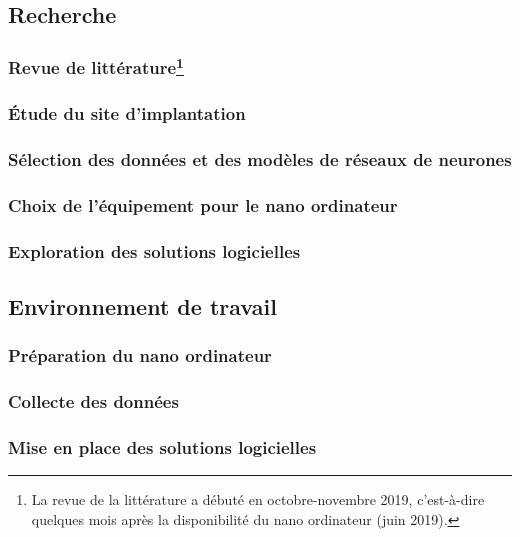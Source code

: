 \subsection{Recherche}

\subsubsection[Revue de littérature]{Revue de littérature\footnote{La revue de la littérature a débuté en octobre-novembre 2019, c'est-à-dire quelques mois après la disponibilité du nano ordinateur (juin 2019).}}

\subsubsection{Étude du site d'implantation}

\subsubsection{Sélection des données et des modèles de réseaux de neurones}

\subsubsection{Choix de l'équipement pour le nano ordinateur}

\subsubsection{Exploration des solutions logicielles}

\subsection{Environnement de travail}

\subsubsection{Préparation du nano ordinateur}

\subsubsection{Collecte des données}
\label{section:collecte_donnees}
\subsubsection{Mise en place des solutions logicielles}

